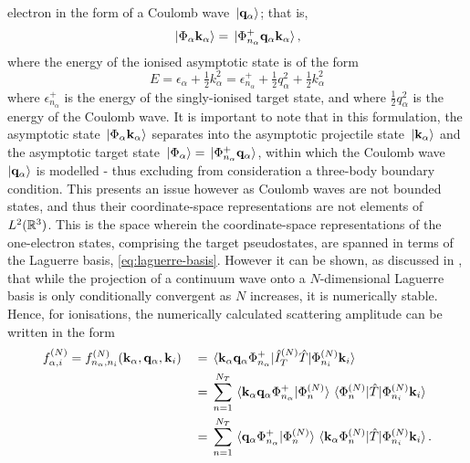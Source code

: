 \documentclass[draft]{article}
\begin{document}
electron in the form of a Coulomb wave $\ket*{\vb{q}_{\alpha}}$; that is,
\begin{equation}
  \label{eq:asymptotic-ionised}
  \ket*{\Phi_{\alpha} \vb{k}_{\alpha}}
  =
  \ket*{\Phi_{n_{\alpha}}^{+} \vb{q}_{\alpha} \vb{k}_{\alpha}}
  ,
\end{equation}
where the energy of the ionised asymptotic state is of the form
\begin{equation}
  \label{eq:asymptotic-ionised-energy}
  E
  =
  \epsilon_{\alpha}
  +
  \tfrac{1}{2}
  k_{\alpha}^{2}
  =
  \epsilon_{n_{\alpha}}^{+}
  +
  \tfrac{1}{2}
  q_{\alpha}^{2}
  +
  \tfrac{1}{2}
  k_{\alpha}^{2}
\end{equation}
where $\epsilon_{n_{\alpha}}^{+}$ is the energy of the singly-ionised target
state, and where $\tfrac{1}{2} q_{\alpha}^{2}$ is the energy of the Coulomb
wave.
It is important to note that in this formulation, the asymptotic state
$\ket*{\Phi_{\alpha} \vb{k}_{\alpha}}$ separates into the asymptotic projectile
state $\ket*{\vb{k}_{\alpha}}$ and the asymptotic target state
$\ket*{\Phi_{\alpha}} = \ket*{\Phi_{n_{\alpha}}^{+} \vb{q}_{\alpha}}$, within
which the Coulomb wave $\ket{\vb{q}_{\alpha}}$ is modelled - thus excluding from
consideration a three-body boundary condition.
This presents an issue however as Coulomb waves are not bounded states, and
thus their coordinate-space representations are not elements of
$L^{2}(\mathbb{R}^{3})$.
This is the space wherein the coordinate-space representations of the
one-electron states, comprising the target pseudostates, are spanned in terms of
the Laguerre basis, \autoref{eq:laguerre-basis}.
However it can be shown, as discussed in \cite{BRAY19951}, that while the
projection of a continuum wave onto a $N$-dimensional Laguerre basis is only
conditionally convergent as $N$ increases, it is numerically stable.
Hence, for ionisations, the numerically calculated scattering amplitude can be
written in the form
\begin{alignat}{2}
  \label{eq:scattering-amplitude-ionisation}
  &
  f_{\alpha, i}^{(N)}
  =
  f_{n_{\alpha}, n_{i}}^{(N)}(
    \vb{k}_{\alpha}, \vb{q}_{\alpha}, \vb{k}_{i}
  )
  &
  {}={}
  &
  \mel*
  {\vb{k}_{\alpha} \vb{q}_{\alpha} \Phi_{n_{\alpha}}^{+}}
  {\hat{I}_{T}^{(N)} \hat{T}}
  {\Phi_{n_{i}}^{(N)} \vb{k}_{i}}
  \nonumber
  \\
  &
  &
  {}={}
  &
  \sum_{n = 1}^{N_{T}}
  \braket*
  {\vb{k}_{\alpha} \vb{q}_{\alpha} \Phi_{n_{\alpha}}^{+}}
  {\Phi_{n}^{(N)}}
  \mel*
  {\Phi_{n}^{(N)}}
  {\hat{T}}
  {\Phi_{n_{i}}^{(N)} \vb{k}_{i}}
  \nonumber
  \\
  &
  &
  {}={}
  &
  \sum_{n = 1}^{N_{T}}
  \braket*
  {\vb{q}_{\alpha} \Phi_{n_{\alpha}}^{+}}
  {\Phi_{n}^{(N)}}
  \mel*
  {\vb{k}_{\alpha} \Phi_{n}^{(N)}}
  {\hat{T}}
  {\Phi_{n_{i}}^{(N)} \vb{k}_{i}}
  .
\end{alignat}
\end{document}
